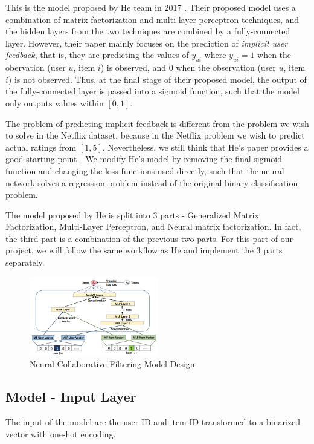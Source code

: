 \documentclass[final]{cvpr}
\begin{document}
This is the model proposed by He team in 2017 \cite{NeuralCF}. Their proposed model uses a combination of matrix factorization and multi-layer perceptron techniques, and the hidden layers from the two techniques are combined by a fully-connected layer. However, their paper mainly focuses on the prediction of \textit{implicit user feedback}, that is, they are predicting the values of $y_{ui}$ where $y_{ui}=1$ when the obervation (user $u$, item $i$) is observed, and $0$ when the
observation (user $u$, item $i$) is not observed. Thus, at the final stage of their proposed model, the output of the fully-connected layer is passed into a sigmoid function, such that the model only outputs values within $[0, 1]$. 

The problem of predicting implicit feedback is different from the problem we wish to solve in the Netflix dataset, because in the Netflix problem we wish to predict actual ratings from $[1, 5]$.
Nevertheless, we still think that He's paper provides a good starting point - We modify He's model by removing the final sigmoid function and changing the loss functions used directly, such that the neural network solves a regression problem instead of the original binary
classification problem.

The model proposed by He is split into 3 parts - Generalized Matrix Factorization, Multi-Layer Perceptron, and Neural matrix factorization. In fact, the third part is a combination of the previous two parts. For this part of our project, we will follow the same workflow as He and implement the 3 parts separately. 

\begin{figure}[h]
	\includegraphics[width=0.5\textwidth]{./NeuCF.PNG}
	\caption{Neural Collaborative Filtering Model Design \cite{NeuralCF}}
\end{figure}

\subsection{Model - Input Layer}

The input of the model are the user ID and item ID transformed to a binarized vector with one-hot encoding.
\end{document}
